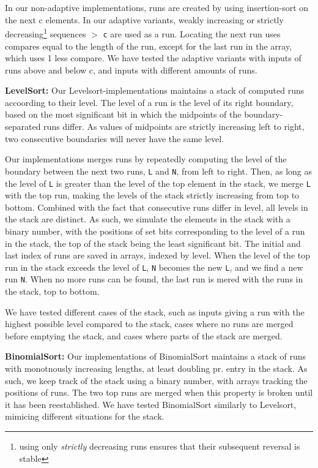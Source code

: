 \documentclass[11pt, a4paper]{article}
\begin{document}
In our non-adaptive implementations, runs are created by using insertion-sort on the next c elements. In our adaptive variants, weakly increasing or strictly decreasing\footnote{using only \textit{strictly} decreasing runs ensures that their subsequent reversal is stable} sequences $>$ \verb|c| are used as a run. Locating the next run uses compares equal to the length of the run, except for the last run in the array, which uses 1 less compare. We have tested the adaptive variants with inputs of runs above and below c, and inputs with different amounts of runs.

\textbf{LevelSort:} Our Levelsort-implementations maintains a stack of computed runs accoording to their level. The level of a run is the level of its right boundary, based on the most significant bit in which the midpoints of the boundary-separated runs differ. As values of midpoints are strictly increasing left to right, two consecutive boundaries will never have the same level.

Our implementations merges runs by repeatedly computing the level of the boundary between the next two runs, \verb|L| and \verb|N|, from left to right. Then, as long as the level of \verb|L| is greater than the level of the top element in the stack, we merge \verb|L| with the top run, making the levels of the stack strictly increasing from top to bottom. Combined with the fact that consecutive runs differ in level, all levels in the stack are distinct. As such, we simulate the elements in the stack with a binary number, with the positions of set bits corresponding to the level of a run in the stack, the top of the stack being the least significant bit. The initial and last index of runs are saved in arrays, indexed by level. When the level of the top run in the stack exceeds the level of \verb|L|, \verb|N| becomes the new \verb|L|, and we find a new run \verb|N|. When no more runs can be found, the last run is mered with the runs in the stack, top to bottom.

We have tested different cases of the stack, such as inputs giving a run with the highest possible level compared to the stack, cases where no runs are merged before emptying the stack, and cases where parts of the stack are merged.

\textbf{BinomialSort:} Our implementations of BinomialSort maintains a stack of runs with monotnously increasing lengths, at least doubling pr. entry in the stack. As such, we keep track of the stack using a binary number, with arrays tracking the positions of runs. The two top runs are merged when this property is broken until it has been reestablished. We have tested BinomialSort similarly to Levelsort, mimicing different situations for the stack.
\end{document}

